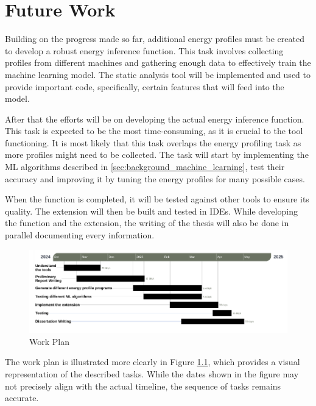 \chapter{Future Work}

Building on the progress made so far, additional energy profiles must be created to develop a robust energy inference function. This task involves collecting profiles from different machines and gathering enough data to effectively train the machine learning model. The static analysis tool will be implemented and used to provide important code, specifically, certain features that will feed into the model.

After that the efforts will be on developing the actual energy inference function. This task is expected to be the most time-consuming, as it is crucial to the tool functioning. It is most likely that this task overlaps the energy profiling task as more profiles might need to be collected. The task will start by implementing the ML algorithms described in \ref{sec:background_machine_learning}, test their accuracy and improving it by tuning the energy profiles for many possible cases.

When the function is completed, it will be tested against other tools to ensure its quality. The extension will then be built and tested in IDEs.
While developing the function and the extension, the writing of the thesis will also be done in parallel documenting every information.

\begin{figure}%
  \centering
  \includegraphics[width = 1 \textwidth]{figures/gantt_diagram.pdf}
  \caption{Work Plan}
  \label{fig:gantt_diagram}
\end{figure}


The work plan is illustrated more clearly in Figure \ref{fig:gantt_diagram}, which provides a visual representation of the described tasks. While the dates shown in the figure may not precisely align with the actual timeline, the sequence of tasks remains accurate.